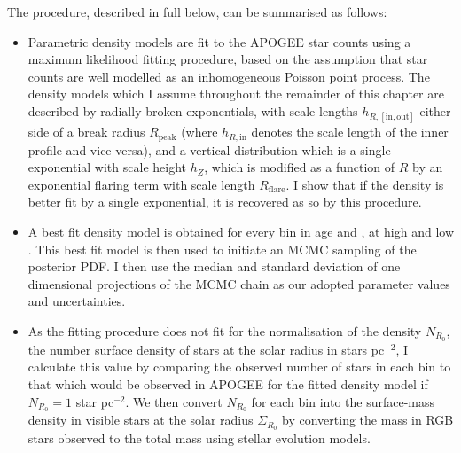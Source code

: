 The procedure, described in full below, can be summarised as follows:
  \begin{itemize}
  \item Parametric density models are fit to the APOGEE star counts using a maximum likelihood fitting procedure, based on the assumption that star counts are well modelled as an inhomogeneous Poisson point process. The density models which I assume throughout the remainder of this chapter are described by radially broken exponentials, with scale lengths $h_{R,\mathrm{[in,out]}}$ either side of a break radius $R_{\mathrm{peak}}$ (where $h_{R,\mathrm{in}}$ denotes the scale length of the inner profile and vice versa), and a vertical distribution which is a single exponential with scale height $h_Z$, which is modified as a function of $R$ by an exponential flaring term with scale length $R_{\mathrm{flare}}$. I show that if the density is better fit by a single exponential, it is recovered as so by this procedure.
 \item A best fit density model is obtained for every bin in age and \feh{}, at high and low \afe{}. This best fit model is then used to initiate an MCMC sampling of the posterior PDF. I then use the median and standard deviation of one dimensional projections of the MCMC chain as our adopted parameter values and uncertainties.
  \item As the fitting procedure does not fit for the normalisation of the density $N_{R_0}$, the number surface density of stars at the solar radius in stars pc$^{-2}$, I calculate this value by comparing the observed number of stars in each bin to that which would be observed in APOGEE for the fitted density model if $N_{R_0} = 1 $ star pc$^{-2}$. We then convert $N_{R_0}$ for each bin into the surface-mass density in visible stars at the solar radius $\Sigma_{R_0}$ by converting the mass in RGB stars observed to the total mass using stellar evolution models.
 \end{itemize}

 

